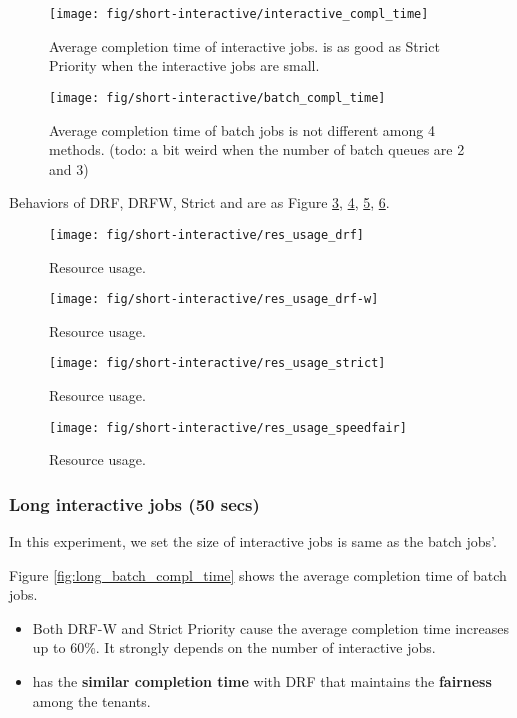 \begin{figure}
	\centering
	\texttt{[image: fig/short-interactive/interactive\_compl\_time]}
	\caption{Average completion time of interactive jobs. \name is as good as Strict Priority when the interactive jobs are small.}
	\label{fig:short_interactive_compl_time}
\end{figure}

\begin{figure}
	\centering
	\texttt{[image: fig/short-interactive/batch\_compl\_time]}
	\caption{Average completion time of batch jobs is not different among 4 methods. (todo: a bit weird when the number of batch queues are 2 and 3)}
	\label{fig:short_batch_compl_time}
\end{figure}

Behaviors of DRF, DRFW, Strict and \name are as Figure \ref{fig:res_usage_drf}, \ref{fig:res_usage_drf_w}, \ref{fig:res_usage_strict}, \ref{fig:res_usage_speedfair}.
\begin{figure}
	\centering
	\texttt{[image: fig/short-interactive/res\_usage\_drf]}
	\caption{Resource usage.}
	\label{fig:res_usage_drf}
\end{figure}
\begin{figure}
	\centering
	\texttt{[image: fig/short-interactive/res\_usage\_drf-w]}
	\caption{Resource usage.}
	\label{fig:res_usage_drf_w}
\end{figure}
\begin{figure}
	\centering
	\texttt{[image: fig/short-interactive/res\_usage\_strict]}
	\caption{Resource usage.}
	\label{fig:res_usage_strict}
\end{figure}
\begin{figure}
	\centering
	\texttt{[image: fig/short-interactive/res\_usage\_speedfair]}
	\caption{Resource usage.}
	\label{fig:res_usage_speedfair}
\end{figure}

\subsubsection{Long interactive jobs (50 secs)}
In this experiment, we set the size of interactive jobs is same as the batch jobs'.

Figure \ref{fig:long_batch_compl_time} shows the average completion time of batch jobs. 
\begin{itemize}
	\item Both DRF-W and Strict Priority cause the average completion time increases up to 60\%. It strongly depends on the number of interactive jobs.
	\item \name has the \textbf{similar completion time} with DRF that maintains the \textbf{fairness} among the tenants.
\end{itemize}

